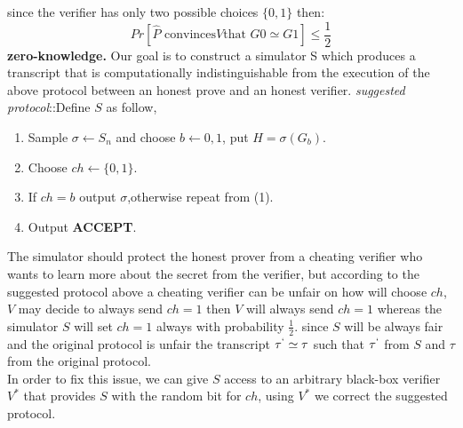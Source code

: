 \documentclass[12pt,a4paper]{article}
\begin{document}
since the verifier has only two possible choices $\{0,1\}$ then:
$$Pr[\hat{P}\text{ convinces} V \text{that }G0\simeq G1]\leq \frac{1}{2}$$
\textbf{zero-knowledge.}
Our goal is to construct a simulator S which produces a transcript that is computationally indistinguishable from the execution of the above protocol between an honest prove and an honest verifier.
\textit{suggested protocol}::Define $S$ as follow,\\
\begin{enumerate}	
	\item
	\begin{enumerate}
Sample $\sigma \longleftarrow S_n$ and choose $b \longleftarrow {0,1}$, put $H=\sigma(G_b)$.
\end{enumerate}
\item
\begin{enumerate}
Choose $ch \longleftarrow \{0,1\}$.
\end{enumerate}
\item
\begin{enumerate}
If $ch=b$ output $\sigma$,otherwise repeat from (1).
\end{enumerate}
\item
\begin{enumerate}
Output \textbf{ACCEPT}.
\end{enumerate}
\end{enumerate}
The simulator should protect the honest prover from a cheating verifier who wants to learn more about the secret from the verifier,  but according to the suggested protocol above a cheating verifier can be unfair on how will choose $ch$, $V$ may decide to always send $ch=1$ then $V$ will always send $ch=1$ whereas the simulator $S$ will set $ch=1$ always with probability $\frac{1}{2}$. since $S$ will be always fair and the original protocol is unfair the transcript $\tau^{`} \simeq  \tau$ such that $\tau^{`}$ from $S$ and $\tau$ from the original protocol.\\
In order to fix this issue, we can give $S$ access to an arbitrary black-box verifier $V^*$ that provides $S$ with the random bit for $ch$, using $V^*$ we correct the suggested protocol.\\
\end{document}
